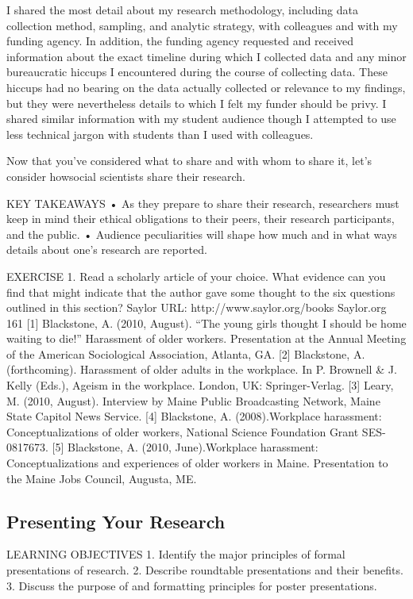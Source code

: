 I shared the most detail about my research methodology, including data collection method, sampling, and analytic strategy, with colleagues and with my funding agency. In addition, the funding agency requested and received information about the exact timeline during which I collected data and any minor bureaucratic hiccups I encountered during the course of collecting data. These hiccups had no bearing on the data actually collected or relevance to my findings, but they were nevertheless details to which I felt my funder should be privy. I shared similar information with my student audience though I attempted to use less technical jargon with students than I used with colleagues.

Now that you’ve considered what to share and with whom to share it, let’s consider howsocial scientists share their research.

KEY TAKEAWAYS
• As they prepare to share their research, researchers must keep in mind their ethical obligations to their peers, their research participants, and the public.
• Audience peculiarities will shape how much and in what ways details about one’s research are reported.

EXERCISE
1. Read a scholarly article of your choice. What evidence can you find that might indicate that the author gave some thought to the six questions outlined in this section?
Saylor URL: http://www.saylor.org/books Saylor.org
161
[1] Blackstone, A. (2010, August). “The young girls thought I should be home waiting to die!” Harassment of older workers. Presentation at the Annual Meeting of the American Sociological Association, Atlanta, GA.
[2] Blackstone, A. (forthcoming). Harassment of older adults in the workplace. In P. Brownell \& J. Kelly (Eds.), Ageism in the workplace. London, UK: Springer-Verlag.
[3] Leary, M. (2010, August). Interview by Maine Public Broadcasting Network, Maine State Capitol News Service.
[4] Blackstone, A. (2008).Workplace harassment: Conceptualizations of older workers, National Science Foundation Grant SES-0817673.
[5] Blackstone, A. (2010, June).Workplace harassment: Conceptualizations and experiences of older workers in Maine. Presentation to the Maine Jobs Council, Augusta, ME.

\subsection{Presenting Your Research}

LEARNING OBJECTIVES
1. Identify the major principles of formal presentations of research.
2. Describe roundtable presentations and their benefits.
3. Discuss the purpose of and formatting principles for poster presentations.

